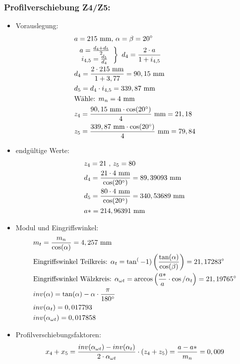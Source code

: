 \subsubsection{Profilverschiebung Z4/Z5:}
\begin{itemize}
\item Vorauslegung:
\begin{align*}
	&a= 215 \text{ mm, } \alpha = \beta = 20^\circ \\
	&\left. \begin{array}{c} a= \frac{d_4 + d_5}{2}\\i_{4,5} = \frac{d_5}{d_4} \end{array} \right\} \text{ }d_4 = \frac{2 \cdot a}{1+i_{4,5}} \\
	&d_4 = \frac{2\cdot 215 \text{ mm}}{1+3,77} = 90,15\text{ mm} \\
	&d_5 = d_4 \cdot i_{4,5} = 339,87 \text{ mm}\\
	&\text{Wähle: }m_n = 4 \text{ mm} \\
	&z_4 = \frac{90,15 \text{ mm} \cdot \cos(20^\circ)}{4 } \text{ mm} = 21,18\\
	&z_5 = \frac{339,87 \text{ mm} \cdot \cos(20^\circ)}{4 } \text{ mm} = 79,84\\
\end{align*}
\item endgültige Werte:
\begin{align*}
	&z_4 = 21 \text{ , } z_5 = 80 \\
	&d_4 = \frac{21 \cdot 4\text{ mm} }{\cos(20^\circ)} = 89,39093 \text{ mm} \\
	&d_5 = \frac{80\cdot 4\text{ mm} }{\cos(20^\circ)} = 340,53689 \text{ mm} \\
	&a* = 214,96391 \text{ mm} \\
\end{align*}
\item Modul und Eingriffswinkel:
\begin{align*}
	&m_t = \frac{m_n}{\cos(\alpha)} = 4,257\text{ mm} \\
	&\text{Eingriffswinkel Teilkreis: } \alpha_t = \tan^(-1) \left( \frac{\tan(\alpha)}{\cos(\beta)} \right) = 21,17283 ^\circ \\
	&\text{Eingriffswinkel Wälzkreis: } \alpha_{\omega t} = \arccos \left( \frac{a*}{a} \cdot \cos/\alpha_t\right) = 21,19765 ^\circ \\
	&inv(\alpha) = \tan(\alpha) -\alpha \cdot \frac{\pi}{180^\circ} \\
	&inv(\alpha_t) = 0,017793 \\
	&inv(\alpha_{\omega t}) = 0,017858 \\
\end{align*}
\item Profilverschiebungsfaktoren:
\begin{align*}
	&x_4 + x_5 = \frac{inv(\alpha_{\omega t})-inv(\alpha_{t})}{2 \cdot \alpha_{\omega t}} \cdot (z_4 + z_5) = \frac{a - a*}{m_n} = 0,009 \\
\end{align*}
\end{itemize}

